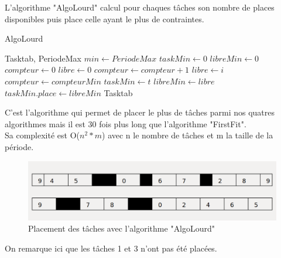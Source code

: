 \documentclass[11pt]{article}
\begin{document}
L'algorithme "AlgoLourd" calcul pour chaques tâches son nombre de places disponibles puis place celle ayant le plus de contraintes.\\
\begin{algorithm}
    \caption{AlgoLourd}
    \begin{algorithmic}
    \REQUIRE Tasktab, PeriodeMax
    \STATE $min \leftarrow PeriodeMax$
    \STATE $taskMin \leftarrow 0$
    \STATE $libreMin \leftarrow 0$
        \STATE $compteur \leftarrow 0$
        \STATE $libre \leftarrow 0$
                    \STATE $compteur \leftarrow compteur + 1$
                    \STATE $libre \leftarrow i$
                \ENDIF
            \ENDFOR
                \STATE $compteur \leftarrow compteurMin$
                \STATE $taskMin \leftarrow t$
                \STATE $libreMin \leftarrow libre$
            \ENDIF
        \ENDFOR
        \STATE $taskMin.place \leftarrow libreMin$
    \ENDFOR
    \RETURN Tasktab
    \end{algorithmic}
\end{algorithm}
C'est l'algorithme qui permet de placer le plus de tâches parmi nos quatres algorithmes mais il est 30 fois plus long que l'algorithme "FirstFit".\\
Sa complexité est O($n^2*m$) avec n le nombre de tâches et m la taille de la période.
\begin{figure}[!ht]
    \center
    \includegraphics[scale = 0.35]{AlgoLourd}
    \caption{Placement des tâches avec l'algorithme "AlgoLourd"}
\end{figure}
\noindent On remarque ici que les tâches 1 et 3 n'ont pas été placées.
\end{document}
